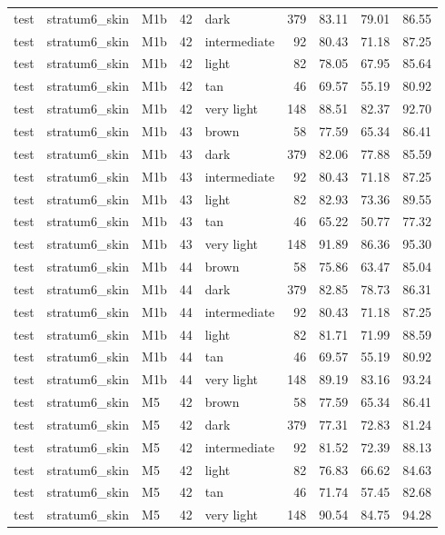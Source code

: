 \begin{tabular}{lllrlrrrr}
test & stratum6\_skin & M1b & 42 & dark & 379 & 83.11 & 79.01 & 86.55 \\
test & stratum6\_skin & M1b & 42 & intermediate & 92 & 80.43 & 71.18 & 87.25 \\
test & stratum6\_skin & M1b & 42 & light & 82 & 78.05 & 67.95 & 85.64 \\
test & stratum6\_skin & M1b & 42 & tan & 46 & 69.57 & 55.19 & 80.92 \\
test & stratum6\_skin & M1b & 42 & very light & 148 & 88.51 & 82.37 & 92.70 \\
test & stratum6\_skin & M1b & 43 & brown & 58 & 77.59 & 65.34 & 86.41 \\
test & stratum6\_skin & M1b & 43 & dark & 379 & 82.06 & 77.88 & 85.59 \\
test & stratum6\_skin & M1b & 43 & intermediate & 92 & 80.43 & 71.18 & 87.25 \\
test & stratum6\_skin & M1b & 43 & light & 82 & 82.93 & 73.36 & 89.55 \\
test & stratum6\_skin & M1b & 43 & tan & 46 & 65.22 & 50.77 & 77.32 \\
test & stratum6\_skin & M1b & 43 & very light & 148 & 91.89 & 86.36 & 95.30 \\
test & stratum6\_skin & M1b & 44 & brown & 58 & 75.86 & 63.47 & 85.04 \\
test & stratum6\_skin & M1b & 44 & dark & 379 & 82.85 & 78.73 & 86.31 \\
test & stratum6\_skin & M1b & 44 & intermediate & 92 & 80.43 & 71.18 & 87.25 \\
test & stratum6\_skin & M1b & 44 & light & 82 & 81.71 & 71.99 & 88.59 \\
test & stratum6\_skin & M1b & 44 & tan & 46 & 69.57 & 55.19 & 80.92 \\
test & stratum6\_skin & M1b & 44 & very light & 148 & 89.19 & 83.16 & 93.24 \\
test & stratum6\_skin & M5 & 42 & brown & 58 & 77.59 & 65.34 & 86.41 \\
test & stratum6\_skin & M5 & 42 & dark & 379 & 77.31 & 72.83 & 81.24 \\
test & stratum6\_skin & M5 & 42 & intermediate & 92 & 81.52 & 72.39 & 88.13 \\
test & stratum6\_skin & M5 & 42 & light & 82 & 76.83 & 66.62 & 84.63 \\
test & stratum6\_skin & M5 & 42 & tan & 46 & 71.74 & 57.45 & 82.68 \\
test & stratum6\_skin & M5 & 42 & very light & 148 & 90.54 & 84.75 & 94.28 \\

\end{tabular}
